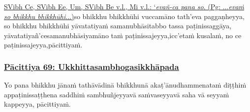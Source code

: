 {{{		\hypertarget{endnote359-appendix}{\hyperlink{endnote359-body}{SVibh Ce, SVibh Ee, Um, SVibh Be v.l., Mi v.l.: `\textit{evañ-ca pana so}. (Pg: ...\textit{evaṁ so bhikkhu bhikkhūhi}...)}}}}}\makeatother \thinspace so bhikkhu bhikkhūhi vuccamāno tath'eva paggaṇheyya, so bhikkhu bhikkhūhi yāvatatiyaṁ samanubhāsitabbo tassa paṭinissaggāya, yāvatatiyañ'ce\makeatletter\hyperlink{endnote360-appendix}\makeatother \thinspace samanubhāsiyamāno taṁ paṭinissajeyya,\makeatletter\hyperlink{endnote361-appendix}\makeatother \thinspace icc'etaṁ kusalaṁ, no ce paṭinissajeyya,\makeatletter\hyperlink{endnote362-appendix}\makeatother \thinspace pācittiyaṁ.



\subsubsection*{\hyperref[exp69]{Pācittiya 69: Ukkhittasambhogasikkhāpada}}
\label{pac69}

Yo pana bhikkhu jānaṁ tathāvādinā bhikkhunā akaṭ'ānudhammena\makeatletter\hyperlink{endnote363-appendix}\makeatother \thinspace taṁ diṭṭhiṁ appaṭinissaṭṭhena saddhiṁ sambhuñjeyya\makeatletter\hyperlink{endnote364-appendix}\makeatother \thinspace vā saṁvaseyya\makeatletter\hyperlink{endnote365-appendix}\makeatother \thinspace vā saha vā seyyaṁ kappeyya, pācittiyaṁ.



